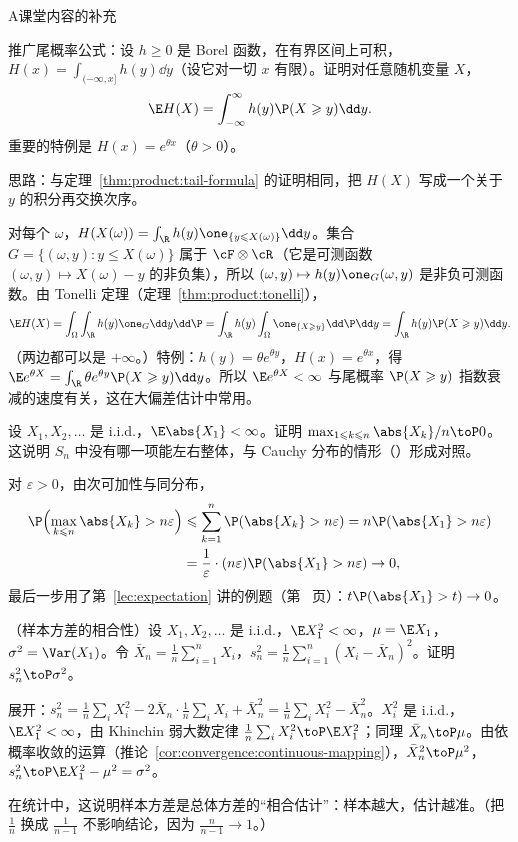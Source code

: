 \begin{exercises}{A}{课堂内容的补充}
\item\label{ex:weak-laws:A5} 推广尾概率公式：设 $h\geqslant0$ 是 Borel 函数，在有界区间上可积，$H(x)=\int_{(-\infty,x]}h(y)\dd y$（设它对一切 $x$ 有限）。证明对任意随机变量 $X$，
\[
\E H(X)=\int_{-\infty}^\infty h(y)\P(X\geqslant y)\dd y .
\]
重要的特例是 $H(x)=e^{\theta x}$（$\theta>0$）。
\begin{solution}
思路：与定理~\ref{thm:product:tail-formula} 的证明相同，把 $H(X)$ 写成一个关于 $y$ 的积分再交换次序。

对每个 $\omega$，$H(X(\omega))=\int_\R h(y)\one_{\{y\leqslant X(\omega)\}}\dd y$。集合 $G=\{(\omega,y):y\leqslant X(\omega)\}$ 属于 $\cF\otimes\cR$（它是可测函数 $(\omega,y)\mapsto X(\omega)-y$ 的非负集），所以 $(\omega,y)\mapsto h(y)\one_G(\omega,y)$ 是非负可测函数。由 Tonelli 定理（定理~\ref{thm:product:tonelli}），
\[
\E H(X)=\int_\Omega\int_\R h(y)\one_G\dd y\dd \P=\int_\R h(y)\int_\Omega\one_{\{X\geqslant y\}}\dd \P\dd y=\int_\R h(y)\P(X\geqslant y)\dd y .
\]
（两边都可以是 $+\infty$。）特例：$h(y)=\theta e^{\theta y}$，$H(x)=e^{\theta x}$，得 $\E e^{\theta X}=\int_\R\theta e^{\theta y}\P(X\geqslant y)\dd y$。所以 $\E e^{\theta X}<\infty$ 与尾概率 $\P(X\geqslant y)$ 指数衰减的速度有关，这在大偏差估计中常用。
\end{solution}

\item\label{ex:weak-laws:A6} 设 $X_1,X_2,\dots$ 是 i.i.d.，$\E\abs{X_1}<\infty$。证明 $\max_{1\leqslant k\leqslant n}\abs{X_k}/n\toP0$。这说明 $S_n$ 中没有哪一项能左右整体，与 Cauchy 分布的情形（）形成对照。
\begin{solution}
对 $\varepsilon>0$，由次可加性与同分布，
\[
\begin{aligned}
\P\Bigl(\max_{k\leqslant n}\abs{X_k}>n\varepsilon\Bigr)&\leqslant\sum_{k=1}^n\P(\abs{X_k}>n\varepsilon)=n\P(\abs{X_1}>n\varepsilon)\\
&=\frac1\varepsilon\cdot(n\varepsilon)\P(\abs{X_1}>n\varepsilon)\to0,
\end{aligned}
\]
最后一步用了第~\ref{lec:expectation} 讲的例题（第~\pageref{we:expectation:tP} 页）：$t\P(\abs{X_1}>t)\to0$。
\end{solution}

\item\label{ex:weak-laws:A7} （样本方差的相合性）设 $X_1,X_2,\dots$ 是 i.i.d.，$\E X_1^2<\infty$，$\mu=\E X_1$，$\sigma^2=\Var(X_1)$。令 $\bar X_n=\frac1n\sum_{i=1}^nX_i$，$s_n^2=\frac1n\sum_{i=1}^n(X_i-\bar X_n)^2$。证明 $s_n^2\toP\sigma^2$。
\begin{solution}
展开：$s_n^2=\frac1n\sum_iX_i^2-2\bar X_n\cdot\frac1n\sum_iX_i+\bar X_n^2=\frac1n\sum_iX_i^2-\bar X_n^2$。$X_i^2$ 是 i.i.d.，$\E X_1^2<\infty$，由 Khinchin 弱大数定律 $\frac1n\sum_iX_i^2\toP \E X_1^2$；同理 $\bar X_n\toP\mu$。由依概率收敛的运算（推论~\ref{cor:convergence:continuous-mapping}），$\bar X_n^2\toP\mu^2$，$s_n^2\toP \E X_1^2-\mu^2=\sigma^2$。

在统计中，这说明样本方差是总体方差的“相合估计”：样本越大，估计越准。（把 $\frac1n$ 换成 $\frac1{n-1}$ 不影响结论，因为 $\frac n{n-1}\to1$。）
\end{solution}
\end{exercises}

